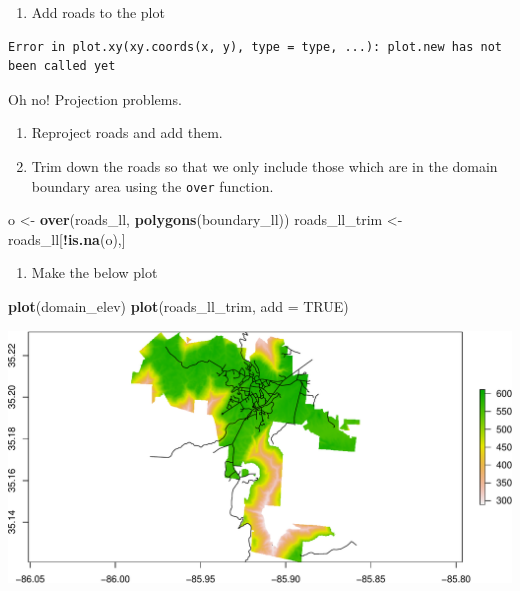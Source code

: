 \documentclass[
]{book}
\newenvironment{Shaded}{\begin{snugshade}}{\end{snugshade}}
\newcommand{\DataTypeTok}[1]{\textcolor[rgb]{0.13,0.29,0.53}{#1}}
\newcommand{\KeywordTok}[1]{\textcolor[rgb]{0.13,0.29,0.53}{\textbf{#1}}}
\newcommand{\NormalTok}[1]{#1}
\newcommand{\OperatorTok}[1]{\textcolor[rgb]{0.81,0.36,0.00}{\textbf{#1}}}
\newcommand{\OtherTok}[1]{\textcolor[rgb]{0.56,0.35,0.01}{#1}}
\newcommand{\StringTok}[1]{\textcolor[rgb]{0.31,0.60,0.02}{#1}}
\providecommand{\tightlist}{%
  \setlength{\itemsep}{0pt}\setlength{\parskip}{0pt}}
\begin{document}
\begin{enumerate}
\def\labelenumi{\arabic{enumi}.}
\setcounter{enumi}{23}
\tightlist
\item
  Add roads to the plot
\end{enumerate}

\begin{verbatim}
Error in plot.xy(xy.coords(x, y), type = type, ...): plot.new has not been called yet
\end{verbatim}

Oh no! Projection problems.

\begin{enumerate}
\def\labelenumi{\arabic{enumi}.}
\setcounter{enumi}{24}
\item
  Reproject roads and add them.
\item
  Trim down the roads so that we only include those which are in the domain boundary area using the \texttt{over} function.
\end{enumerate}

\begin{Shaded}
\begin{Highlighting}[]
\NormalTok{o <-}\StringTok{ }\KeywordTok{over}\NormalTok{(roads_ll, }\KeywordTok{polygons}\NormalTok{(boundary_ll))}
\NormalTok{roads_ll_trim <-}\StringTok{ }\NormalTok{roads_ll[}\OperatorTok{!}\KeywordTok{is.na}\NormalTok{(o),]}
\end{Highlighting}
\end{Shaded}

\begin{enumerate}
\def\labelenumi{\arabic{enumi}.}
\setcounter{enumi}{26}
\tightlist
\item
  Make the below plot
\end{enumerate}

\begin{Shaded}
\begin{Highlighting}[]
\KeywordTok{plot}\NormalTok{(domain_elev)}
\KeywordTok{plot}\NormalTok{(roads_ll_trim, }\DataTypeTok{add =} \OtherTok{TRUE}\NormalTok{)}
\end{Highlighting}
\end{Shaded}

\includegraphics{figures/unnamed-chunk-572-1.pdf}
\end{document}
